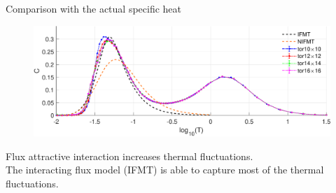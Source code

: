 \begin{frame}{Comparison with the actual specific heat}
    \begin{figure}
        \centering
        \begin{minipage}[c]{.8\textwidth}
            \includegraphics[width = 1\textwidth]{figures/thermo_limit_C.pdf}
        \end{minipage}
    \end{figure}
    Flux attractive interaction increases thermal fluctuations. \\
    The interacting flux model (IFMT) is able to capture most of the thermal fluctuations. 
\end{frame}


